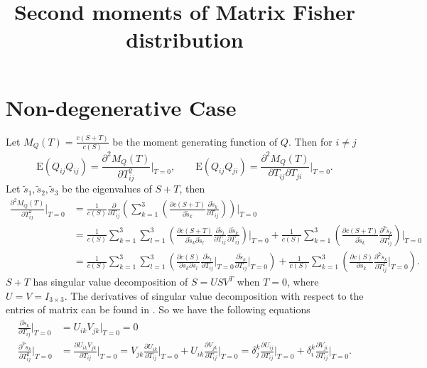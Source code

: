 \documentclass[10pt]{article}
\title{\vspace{-4ex}\textbf{Second moments of Matrix Fisher distribution\vspace{-4ex}}}
\date{}
\begin{document}
\maketitle

\section{Non-degenerative Case}
Let $M_Q(T) = \frac{c(S+T)}{c(S)}$ be the moment generating function of $Q$.
Then for $i \neq j$
\begin{equation}
	\mathrm{E}(Q_{ij}Q_{ij}) = \frac{\partial^2 M_Q(T)}{\partial T_{ij}^2}\bigg|_{T=0}, \qquad
	\mathrm{E}(Q_{ij}Q_{ji}) = \frac{\partial^2 M_Q(T)}{\partial T_{ij} \partial T_{ji}}\bigg|_{T=0}.
\end{equation}
Let $\tilde{s}_1, \tilde{s}_2, \tilde{s}_3$ be the eigenvalues of $S+T$, then
\begin{align} \label{eqn:MGFDeriv}
	\frac{\partial^2 M_Q(T)}{\partial T_{ij}^2}\bigg|_{T=0} &= \frac{1}{c(S)}\frac{\partial}{\partial T_{ij}} \left(\sum_{k=1}^3\left(\frac{\partial c(S+T)}{\partial\tilde{s}_k}\frac{\partial \tilde{s}_k}{\partial T_{ij}}\right)\right)\bigg|_{T=0} \nonumber \\
	&= \frac{1}{c(S)}\sum_{k=1}^3\sum_{l=1}^3\left(\frac{\partial c(S+T)}{\partial\tilde{s}_k\partial\tilde{s}_l}\frac{\partial\tilde{s}_l}{\partial T_{ij}}\frac{\partial\tilde{s}_k}{\partial T_{ij}}\right)\bigg|_{T=0} + \frac{1}{c(S)}\sum_{k=1}^3\left(\frac{\partial c(S+T)}{\partial\tilde{s}_k}\frac{\partial^2\tilde{s}_k}{\partial T_{ij}^2}\right)\bigg|_{T=0} \nonumber \\
	&= \frac{1}{c(S)}\sum_{k=1}^3\sum_{l=1}^3\left(\frac{\partial c(S)}{\partial s_k\partial s_l}\frac{\partial\tilde{s}_l}{\partial T_{ij}}\bigg|_{T=0}\frac{\partial\tilde{s}_k}{\partial T_{ij}}\bigg|_{T=0}\right) + \frac{1}{c(S)}\sum_{k=1}^3\left(\frac{\partial c(S)}{\partial s_k}\frac{\partial^2\tilde{s}_k}{\partial T_{ij}^2}\bigg|_{T=0}\right).
\end{align}
$S+T$ has singular value decomposition of $S=USV^T$ when $T=0$, where $U=V=I_{3\times 3}$.
The derivatives of singular value decomposition with respect to the entries of matrix can be found in \cite{papadopoulo2000estimating}.
So we have the following equations
\begin{align} \label{eqn:SDeriv}
	\frac{\partial\tilde{s}_k}{\partial T_{ij}}\bigg|_{T=0} &= U_{ik}V_{jk}\bigg|_{T=0} = 0 \nonumber \\
	\frac{\partial^2\tilde{s}_k}{\partial T_{ij}^2}\bigg|_{T=0} &= \frac{\partial U_{ik}V_{jk}}{\partial T_{ij}}\bigg|_{T=0} = V_{jk}\frac{\partial U_{ik}}{\partial T_{ij}}\bigg|_{T=0} + U_{ik}\frac{\partial V_{jk}}{\partial T_{ij}}\bigg|_{T=0} = \delta_j^k\frac{\partial U_{ij}}{\partial T_{ij}}\bigg|_{T=0} + \delta_i^k\frac{\partial V_{ji}}{\partial T_{ij}}\bigg|_{T=0}.
\end{align}
\end{document}
